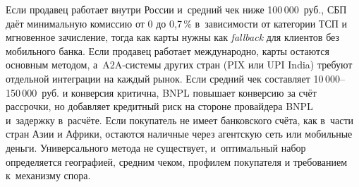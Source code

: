 Если продавец работает внутри России и~средний
чек ниже 100\,000~руб., СБП даёт минимальную комиссию
от 0 до 0{,}7\,\% в~зависимости от категории ТСП и мгновенное зачисление,
тогда как карты нужны как \textit{fallback} для клиентов без мобильного банка.
Если продавец работает международно, карты остаются основным
методом, а~A2A-системы других стран (PIX или UPI India) требуют
отдельной интеграции на каждый рынок. Если средний чек составляет
10\,000--150\,000~руб. и конверсия критична, BNPL повышает
конверсию за счёт рассрочки, но добавляет кредитный риск
на стороне провайдера BNPL и~задержку в~расчёте. Если
покупатель не имеет банковского счёта, как в~части стран Азии
и Африки, остаются наличные через агентскую сеть или мобильные
деньги. Универсального метода не существует, и~оптимальный набор
определяется географией, средним чеком, профилем покупателя
и требованием к~механизму спора.

